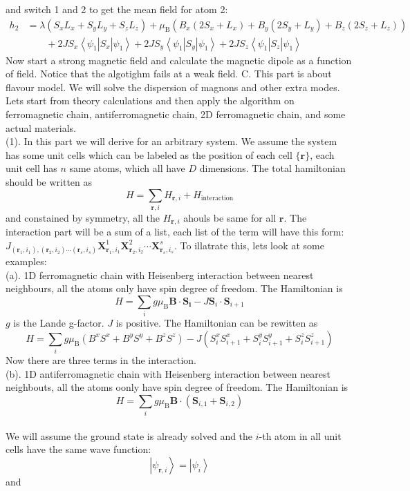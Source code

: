 \documentclass[letter]{article}
\begin{document}
and switch 1 and 2 to get the mean field for atom 2:
$$\begin{aligned}   
   h_2 &=\lambda \left(S_xL_x+S_y L_y+S_z L_z\right)+\mu_{\mathrm{B}}\left( B_x(2S_x+L_x)+B_y(2S_y+L_y)+B_z(2S_z+L_z) \right)\\&\ \ \ \ \ \ \ \ \ +2JS_x\left<\psi_1\right|S_x\left|\psi_1\right>+2JS_y\left<\psi_1\right|S_y\left|\psi_1\right>+2JS_z\left<\psi_1\right|S_z\left|\psi_1\right>
\end{aligned}
$$
Now start a strong magnetic field and calculate the magnetic dipole as a function of field. Notice that the algotighm fails at a weak field.
C. This part is about flavour model. We will solve the dispersion of magnons and other extra modes. Lets start from theory calculations and then apply the algorithm on ferromagnetic chain, antiferromagnetic chain, 2D ferromagnetic chain, and some actual materials.\\
\indent (1). In this part we will derive for an arbitrary system. We assume the system has some unit cells which can be labeled as the position of each cell $\{\bm{r}\}$, each unit cell has $n$ same atoms, which all have $D$ dimensions. The total hamiltonian should be written as $$
H=\sum_{\bm{r},i}H_{\bm{r},i}+H_{\mathrm{interaction}}
$$ and constained by symmetry, all the $H_{\bm{r},i}$ ahouls be same for all $\bm{r}$. The interaction part will be a sum of a list, each list of the term will have this form: $J_{(\bm{r}_1,i_1),(\bm{r}_2,i_2)\cdots (\bm{r}_s,i_s)} \bm{X}^1_{\bm{r}_1,i_1} \bm{X}^2_{\bm{r}_2,i_2} \cdots\bm{X}^s_{\bm{r}_s,i_s}$. To illatrate this, lets look at some examples:\\
\indent (a). 1D ferromagnetic chain with Heisenberg interaction between nearest neighbours, all the atoms only have spin degree of freedom. The Hamiltonian is $$
H=\sum_{i}g\mu_{\mathrm{B}}\bm{B}\cdot\bm{S_i}-J\bm{S}_{i}\cdot\bm{S}_{i+1}
$$
$g$ is the Lande  g-factor. $J$ is positive. The Hamiltonian can be rewitten as $$
H=\sum_{i}g\mu_{\mathrm{B}}(B^x S^x +B^y S^y+B^z S^z)-J(S_{i}^x S_{i+1}^x+S_{i}^y S_{i+1}^y+S_{i}^z S_{i+1}^z)
$$
Now there are three terms in the interaction.\\
\indent (b). 1D antiferromagnetic chain with Heisenberg interaction between nearest neighbouts, all the atoms oonly have spin degree of freedom. The Hamiltonian is $$
H=\sum_i g\mu_{\mathrm{B}}\bm{B}\cdot(\bm{S}_{i,1}+\bm{S}_{i,2})
$$
\\
 We will assume the ground state is already solved and the $i$-th atom in all unit cells have the same wave function:$$
\left|\psi_{\bm{r},i}\right>=\left|\psi_i\right>
$$
and 
\end{document}
